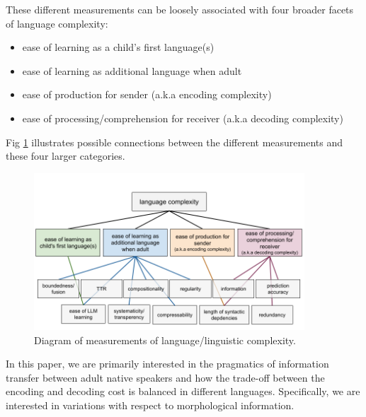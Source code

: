 \documentclass[USenglish]{article}
\begin{document}
These different measurements can be loosely associated with four broader facets of language complexity:

\begin{itemize}
\item ease of learning as a child's first language(s)
\item ease of learning as additional language when adult
\item ease of production for sender (a.k.a encoding complexity)
\item ease of processing/comprehension for receiver (a.k.a decoding complexity)
\end{itemize}

Fig \ref{fig:metrics_diagram} illustrates possible connections between the different measurements and these four larger categories.

\begin{figure}[ht]
    \centering
    \includegraphics[width=0.9\textwidth]{latex/graphics/ud_complexity_metrics.png} %
    \caption{Diagram of measurements of language/linguistic complexity.}
    \label{fig:metrics_diagram}
\end{figure}

In this paper, we are primarily interested in the pragmatics of information transfer between adult native speakers and how the trade-off between the encoding and decoding cost is balanced in different languages. Specifically, we are interested in variations with respect to morphological information.



\end{document}
